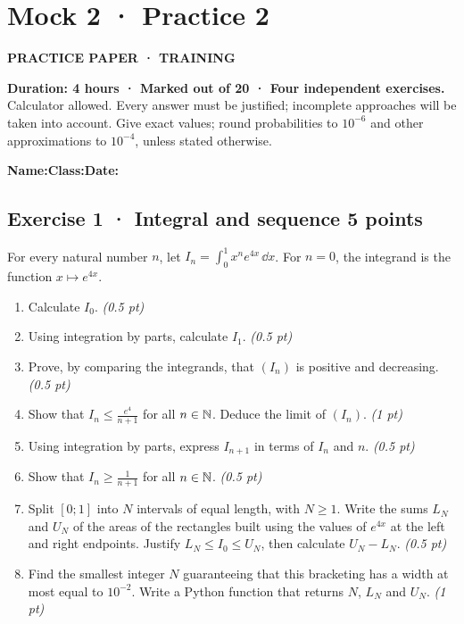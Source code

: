 \fi

\clearpage{}\label{sujet:8-2}

\section*{Mock 2 · Practice 2}

{\sffamily\bfseries\color{teal}PRACTICE PAPER · TRAINING\par}

\textbf{Duration: 4 hours · Marked out of 20 · Four independent exercises.}\\Calculator allowed. Every answer must be justified; incomplete approaches will be taken into account. Give exact values; round probabilities to $10^{-6}$ and other approximations to $10^{-4}$, unless stated otherwise.

\smallskip\textbf{Name:}\enspace\dotfill\quad\textbf{Class:}\enspace\dotfill\quad\textbf{Date:}\enspace\dotfill

\subsection*{Exercise 1 · Integral and sequence \hfill 5 points}For every natural number $n$, let $I_n=\displaystyle\int_0^1x^ne^{4x}\,\dd x$. For $n=0$, the integrand is the function $x\mapsto e^{4x}$.

\begin{enumerate}

\item Calculate $I_0$. \hfill\textit{(0.5 pt)}

\item Using integration by parts, calculate $I_1$. \hfill\textit{(0.5 pt)}

\item Prove, by comparing the integrands, that $(I_n)$ is positive and decreasing. \hfill\textit{(0.5 pt)}

\item Show that $I_n\le\frac{e^{4}}{n+1}$ for all $n\in\mathbb N$. Deduce the limit of $(I_n)$. \hfill\textit{(1 pt)}

\item Using integration by parts, express $I_{n+1}$ in terms of $I_n$ and $n$. \hfill\textit{(0.5 pt)}

\item Show that $I_n\ge\frac1{n+1}$ for all $n\in\mathbb N$. \hfill\textit{(0.5 pt)}

\item Split $[0;1]$ into $N$ intervals of equal length, with $N\ge1$. Write the sums $L_N$ and $U_N$ of the areas of the rectangles built using the values of $e^{4x}$ at the left and right endpoints. Justify $L_N\le I_0\le U_N$, then calculate $U_N-L_N$. \hfill\textit{(0.5 pt)}

\item Find the smallest integer $N$ guaranteeing that this bracketing has a width at most equal to $10^{-2}$. Write a Python function that returns $N$, $L_N$ and $U_N$. \hfill\textit{(1 pt)}

\end{enumerate}

